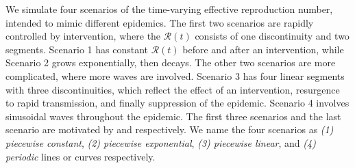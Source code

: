 \documentclass[10pt,letterpaper]{article}
\def\calR{\mathcal{R}}
\begin{document}
We simulate four scenarios of the time-varying effective reproduction number,
intended to mimic different epidemics. The first two scenarios are rapidly 
controlled by intervention, where the $\calR(t)$ consists
of one discontinuity and two segments. Scenario 1 has constant $\calR(t)$ before
and after an intervention, while Scenario 2 grows exponentially, then decays.
The other two scenarios are more complicated, where more waves
are involved. Scenario 3 has four linear segments with three discontinuities,
which reflect the effect of an intervention, resurgence to rapid transmission,
and finally suppression of the epidemic. Scenario 4 involves sinusoidal waves
throughout the epidemic.
The first three scenarios and the last scenario are motivated by
\cite{parag2021improved} and \cite{gressani2022epilps} respectively. 
We name the four scenarios as \textit{(1) piecewise constant}, \textit{(2) 
piecewise exponential}, \textit{(3) piecewise linear}, and \textit{(4) periodic} 
lines or curves respectively. 
\end{document}
